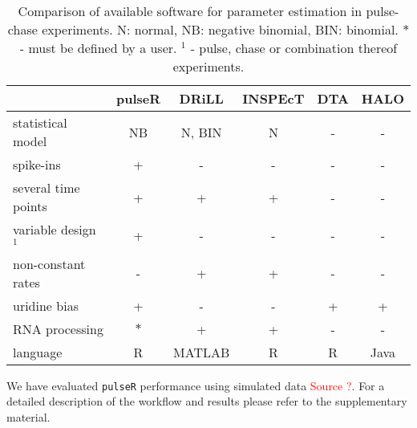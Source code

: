 \begin{table}
 \begin{tabular}{|l|c|c|c|c|c|}\hline
                        &pulseR &DRiLL          &INSPEcT&DTA    &HALO       \\\hline
 statistical model      & NB    &N, BIN         &N       & -    & -      \\\hline                         
 spike-ins              & +     &   -           &  -     &  -    & -         \\\hline               
 several time points    & +     &   +           &  +     &  -    & -         \\\hline                    
  variable design $^1$       & +     &   -           &  -     &  -    & -         \\\hline 
 non-constant rates     & -     &   +           &  +     &  -    & -         \\\hline 
            uridine bias& +     &   -           &  -     &  +    & +         \\\hline 
       RNA processing   &$\ast$ &   +           &  +     &  -    & -         \\\hline 
  language              & R     &MATLAB         &  R     &  R    & Java      \\\hline 
 \end{tabular}
\caption{Comparison of available software for parameter estimation in 
pulse-chase experiments. N: normal, NB: negative binomial, BIN: binomial.
$\ast$ - must be defined by a user. $^1$ - pulse, chase or combination thereof experiments.
}
\end{table}
We have evaluated \verb|pulseR| performance using simulated data \textcolor{red}{Source ?}. 
For a detailed description of the workflow and results please refer to the supplementary material.

